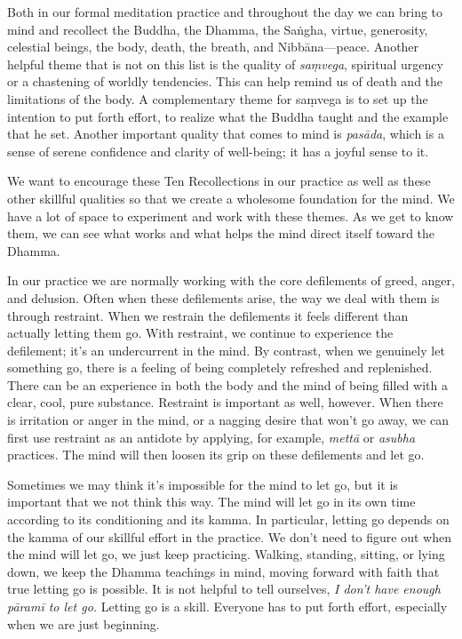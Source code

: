 Both in our formal meditation practice and throughout the day we can 
bring to mind and recollect the Buddha, the Dhamma, the Saṅgha, 
virtue, generosity, celestial beings, the body, death, the breath, and 
Nibbāna---peace. Another helpful theme that is not on this list is the 
quality of \emph{saṃvega}, spiritual urgency or a chastening of 
worldly tendencies. This can help remind us of death and the 
limitations of the body. A complementary theme for saṃvega is to set 
up the intention to put forth effort, to realize what the Buddha taught 
and the example that he set. Another important quality that comes to 
mind is \emph{pasāda}, which is a sense of serene confidence and 
clarity of well-being; it has a joyful sense to it.

We want to encourage these Ten Recollections in our practice as well as 
these other skillful qualities so that we create a wholesome foundation 
for the mind. We have a lot of space to experiment and work with these 
themes. As we get to know them, we can see what works and what helps 
the mind direct itself toward the Dhamma.


In our practice we are normally working with the core defilements of 
greed, anger, and delusion. Often when these defilements arise, the way 
we deal with them is through restraint. When we restrain the 
defilements it feels different than actually letting them go. With 
restraint, we continue to experience the defilement; it's an 
undercurrent in the mind. By contrast, when we genuinely let something 
go, there is a feeling of being completely refreshed and replenished. 
There can be an experience in both the body and the mind of being 
filled with a clear, cool, pure substance. Restraint is important as 
well, however. When there is irritation or anger in the mind, or a 
nagging desire that won't go away, we can first use restraint as an 
antidote by applying, for example, \emph{mettā} or \emph{asubha} 
practices. The mind will then loosen its grip on these defilements and 
let go.

Sometimes we may think it's impossible for the mind to let go, but it 
is important that we not think this way. The mind will let go in its 
own time according to its conditioning and its kamma. In particular, 
letting go depends on the kamma of our skillful effort in the practice. 
We don't need to figure out when the mind will let go, we just keep 
practicing. Walking, standing, sitting, or lying down, we keep the 
Dhamma teachings in mind, moving forward with faith that true letting 
go is possible. It is not helpful to tell ourselves, \emph{I don't have 
enough pāramī to let go.} Letting go is a skill. Everyone has to put 
forth effort, especially when we are just beginning.

